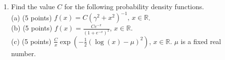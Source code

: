 \documentclass[14pt]{extarticle}
\begin{document}
\begin{enumerate}
    \item Find the value $C$ for the following probability density functions.\\
    (a) (5 points) $f(x)=C(\gamma^2+x^2)^{-1},\,x\in\mathbb{R}$.\\
    (b) (5 points) $f(x)=\frac{Ce^{-x}}{(1+e^{-x})^2}$, $x\in\mathbb{R}$.\\
    (c) (5 points) $\frac{C}{x}\exp(-\frac{1}{2}(\log(x)-\mu)^2)$, $x\in\mathbb{R}$. $\mu$ is a fixed real number.

\end{enumerate}
\end{document}
